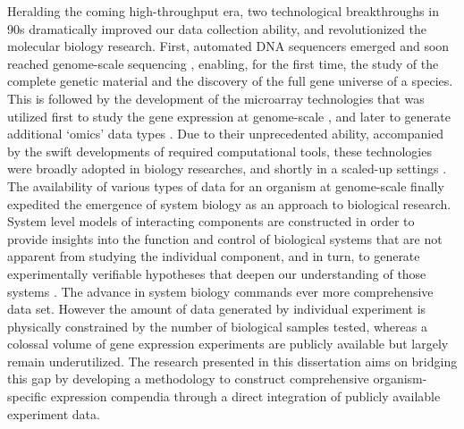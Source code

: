 Heralding the coming high-throughput era, two technological
breakthroughs in 90s dramatically improved our data collection
ability, and revolutionized the molecular biology research.
%
First, automated DNA sequencers emerged and soon reached genome-scale
sequencing \cite{Fleischmann1995}, enabling, for the first time, the
study of the complete genetic material and the discovery of the full
gene universe of a species.
%
%
This is followed by the development of the microarray technologies
\cite{Pease1994, Schena1995} that was utilized first to study the gene
expression at genome-scale \cite{Davis1997}, and later to generate
additional `omics' data types \cite{Blat1999, Uetz2000}.
%
Due to their unprecedented ability, accompanied by the swift
developments of required computational tools, these technologies were
broadly adopted in biology researches, and shortly in a scaled-up
settings \cite{Su2002,Su2004}.
%
The availability of various types of data for an organism at genome-scale
finally expedited the emergence of system biology as an approach to biological
research.  System level models of interacting components are constructed in
order to provide insights into the function and control of biological systems
that are not apparent from studying the individual component, and in turn, to
generate experimentally verifiable hypotheses that deepen our understanding of
those systems \cite{Ideker2001, Palsson2002}.
%
The advance in system biology commands ever more comprehensive data set.
However the amount of data generated by individual experiment is physically
constrained by the number of biological samples tested, whereas a colossal
volume of gene expression experiments are publicly available but largely remain
underutilized.
%
The research presented in this dissertation aims on bridging this gap
by developing a methodology to construct comprehensive
organism-specific expression compendia through a direct integration of
publicly available experiment data.
%

